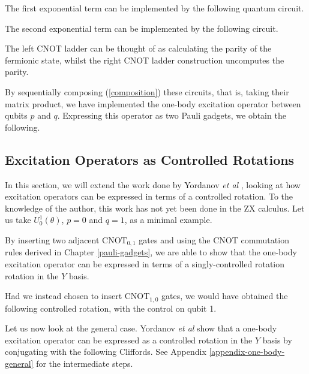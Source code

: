 The first exponential term can be implemented by the following quantum circuit.


The second exponential term can be implemented by the following circuit.


The left CNOT ladder can be thought of as calculating the parity of the fermionic state, whilst the right CNOT ladder construction uncomputes the parity.

By sequentially composing (\ref{composition}) these circuits, that is, taking their matrix product, we have implemented the one-body excitation operator between qubits $p$ and $q$. Expressing this operator as two Pauli gadgets, we obtain the following.


\subsection{Excitation Operators as Controlled Rotations}

In this section, we will extend the work done by Yordanov \textit{et al} \cite{Yordanov2020}, looking at how excitation operators can be expressed in terms of a controlled rotation. To the knowledge of the author, this work has not yet been done in the ZX calculus. Let us take $U^1_0(\theta)$, $p = 0$ and $q = 1$, as a minimal example.


By inserting two adjacent $\text{CNOT}_{0, 1}$ gates and using the CNOT commutation rules derived in Chapter \ref{pauli-gadgets}, we are able to show that the one-body excitation operator can be expressed in terms of a singly-controlled rotation rotation in the $Y$ basis.


Had we instead chosen to insert $\text{CNOT}_{1, 0}$ gates, we would have obtained the following controlled rotation, with the control on qubit 1.


Let us now look at the general case. Yordanov \textit{et al} \cite{Yordanov2020} show that a one-body excitation operator can be expressed as a controlled rotation in the $Y$ basis by conjugating with the following Cliffords. See Appendix \ref{appendix-one-body-general} for the intermediate steps.


